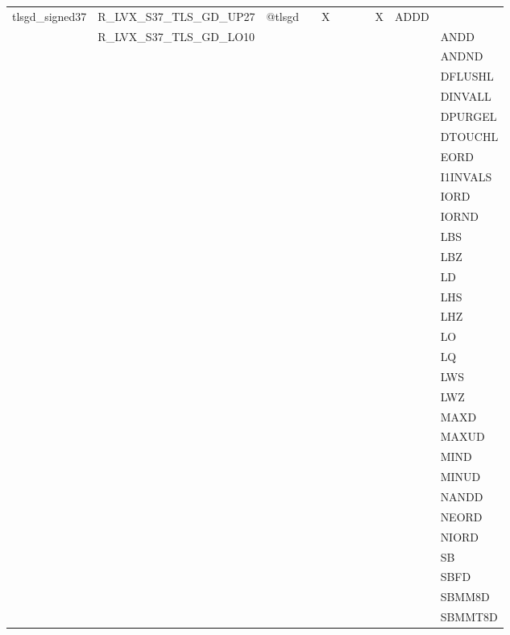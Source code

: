 {\begin{tabular}{|l|l|l|l|l|l|l|l|l|l|l|}
\textsf{tlsgd\_signed37} & \textsf{R\_LVX\_S37\_TLS\_GD\_UP27} & \textsf{@tlsgd} & \textsf{} & \textsf{X} & \textsf{} & \textsf{} & \textsf{} & \textsf{X} & \textsf{ADDD} \\
 & \textsf{R\_LVX\_S37\_TLS\_GD\_LO10} & & & & & & & & & \textsf{ANDD} \\
 & & & & & & & & & & \textsf{ANDND} \\
 & & & & & & & & & & \textsf{DFLUSHL} \\
 & & & & & & & & & & \textsf{DINVALL} \\
 & & & & & & & & & & \textsf{DPURGEL} \\
 & & & & & & & & & & \textsf{DTOUCHL} \\
 & & & & & & & & & & \textsf{EORD} \\
 & & & & & & & & & & \textsf{I1INVALS} \\
 & & & & & & & & & & \textsf{IORD} \\
 & & & & & & & & & & \textsf{IORND} \\
 & & & & & & & & & & \textsf{LBS} \\
 & & & & & & & & & & \textsf{LBZ} \\
 & & & & & & & & & & \textsf{LD} \\
 & & & & & & & & & & \textsf{LHS} \\
 & & & & & & & & & & \textsf{LHZ} \\
 & & & & & & & & & & \textsf{LO} \\
 & & & & & & & & & & \textsf{LQ} \\
 & & & & & & & & & & \textsf{LWS} \\
 & & & & & & & & & & \textsf{LWZ} \\
 & & & & & & & & & & \textsf{MAXD} \\
 & & & & & & & & & & \textsf{MAXUD} \\
 & & & & & & & & & & \textsf{MIND} \\
 & & & & & & & & & & \textsf{MINUD} \\
 & & & & & & & & & & \textsf{NANDD} \\
 & & & & & & & & & & \textsf{NEORD} \\
 & & & & & & & & & & \textsf{NIORD} \\
 & & & & & & & & & & \textsf{SB} \\
 & & & & & & & & & & \textsf{SBFD} \\
 & & & & & & & & & & \textsf{SBMM8D} \\
 & & & & & & & & & & \textsf{SBMMT8D} \\

\end{tabular}}
